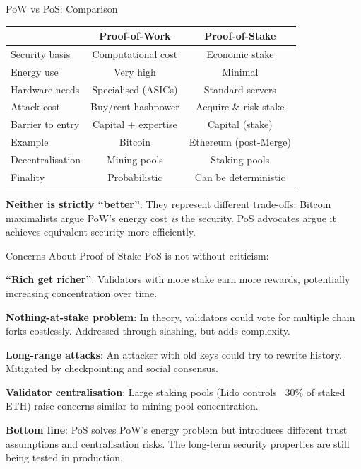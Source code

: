 \documentclass[10pt]{beamer}
\newcommand{\good}[1]{\textcolor{AccentGreen}{#1}}
\newcommand{\bad}[1]{\textcolor{AccentOrange}{#1}}
\begin{document}
\begin{frame}{PoW vs PoS: Comparison}
  \begin{center}
  \begin{tabular}{lcc}
    \toprule
    & \textbf{Proof-of-Work} & \textbf{Proof-of-Stake} \\
    \midrule
    Security basis & Computational cost & Economic stake \\
    Energy use & \bad{Very high} & \good{Minimal} \\
    Hardware needs & Specialised (ASICs) & Standard servers \\
    Attack cost & Buy/rent hashpower & Acquire \& risk stake \\
    Barrier to entry & Capital + expertise & Capital (stake) \\
    Example & Bitcoin & Ethereum (post-Merge) \\
    \midrule
    Decentralisation & Mining pools & Staking pools \\
    Finality & Probabilistic & Can be deterministic \\
    \bottomrule
  \end{tabular}
  \end{center}
  
  \vspace{1em}
  \textbf{Neither is strictly ``better''}: They represent different trade-offs. Bitcoin maximalists argue PoW's energy cost \textit{is} the security. PoS advocates argue it achieves equivalent security more efficiently.
\end{frame}

\begin{frame}{Concerns About Proof-of-Stake}
  PoS is not without criticism:
  
  \vspace{1em}
  \textbf{``Rich get richer''}: Validators with more stake earn more rewards, potentially increasing concentration over time.
  
  \vspace{0.5em}
  \textbf{Nothing-at-stake problem}: In theory, validators could vote for multiple chain forks costlessly. Addressed through slashing, but adds complexity.
  
  \vspace{0.5em}
  \textbf{Long-range attacks}: An attacker with old keys could try to rewrite history. Mitigated by checkpointing and social consensus.
  
  \vspace{0.5em}
  \textbf{Validator centralisation}: Large staking pools (Lido controls ~30\% of staked ETH) raise concerns similar to mining pool concentration.
  
  \vspace{1em}
  \textbf{Bottom line}: PoS solves PoW's energy problem but introduces different trust assumptions and centralisation risks. The long-term security properties are still being tested in production.
\end{frame}
\end{document}
